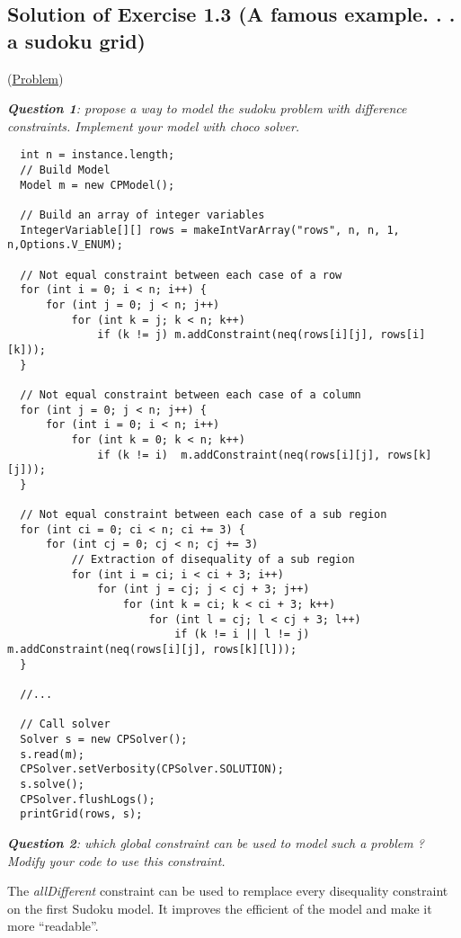 \subsection{Solution of Exercise 1.3 (A famous example. . . a sudoku grid)}\label{solutions:solutionofexercise1.3}\hypertarget{solutions:solutionofexercise1.3}{}

(\hyperlink{exercises:exercise1.3}{Problem})

\noindent\emph{\textbf{Question 1}: propose a way to model the sudoku problem with difference constraints. Implement your model with choco solver.}

\begin{lstlisting}
  int n = instance.length;
  // Build Model
  Model m = new CPModel();
  
  // Build an array of integer variables
  IntegerVariable[][] rows = makeIntVarArray("rows", n, n, 1, n,Options.V_ENUM);
	
  // Not equal constraint between each case of a row
  for (int i = 0; i < n; i++) {
      for (int j = 0; j < n; j++)
          for (int k = j; k < n; k++)
              if (k != j) m.addConstraint(neq(rows[i][j], rows[i][k]));
  }
                  
  // Not equal constraint between each case of a column
  for (int j = 0; j < n; j++) {
      for (int i = 0; i < n; i++)
          for (int k = 0; k < n; k++)
              if (k != i)  m.addConstraint(neq(rows[i][j], rows[k][j]));
  }

  // Not equal constraint between each case of a sub region
  for (int ci = 0; ci < n; ci += 3) {
      for (int cj = 0; cj < n; cj += 3)
          // Extraction of disequality of a sub region
          for (int i = ci; i < ci + 3; i++)
              for (int j = cj; j < cj + 3; j++)
                  for (int k = ci; k < ci + 3; k++)
                      for (int l = cj; l < cj + 3; l++)
                          if (k != i || l != j) m.addConstraint(neq(rows[i][j], rows[k][l]));
  }
	
  //...
	
  // Call solver
  Solver s = new CPSolver();
  s.read(m);
  CPSolver.setVerbosity(CPSolver.SOLUTION);
  s.solve();
  CPSolver.flushLogs();
  printGrid(rows, s);
\end{lstlisting}

\noindent\emph{\textbf{Question 2}: which global constraint can be used to model such a problem ? Modify your code to use this constraint.}

The \emph{allDifferent} constraint can be used to remplace every disequality constraint on the first Sudoku model. It improves the efficient of the model and make it more ``readable''.

